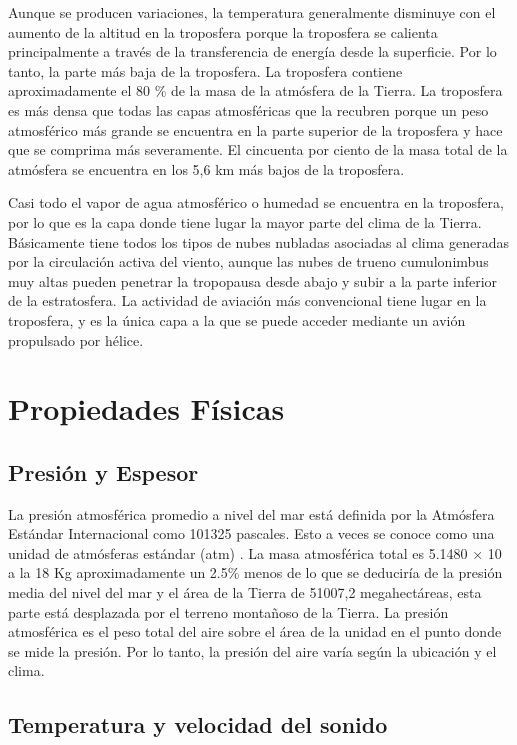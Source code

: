 \documentclass[12pt]{article}
\begin{document}
Aunque se producen variaciones, la temperatura generalmente disminuye con el aumento de la altitud en la troposfera porque la troposfera se calienta principalmente a través de la transferencia de energía desde la superficie. Por lo tanto, la parte más baja de la troposfera. La troposfera contiene aproximadamente el 80 \% de la masa de la atmósfera de la Tierra. La troposfera es más densa que todas las capas atmosféricas que la recubren porque un peso atmosférico más grande se encuentra en la parte superior de la troposfera y hace que se comprima más severamente. El cincuenta por ciento de la masa total de la atmósfera se encuentra en los 5,6 km más bajos de la troposfera.

Casi todo el vapor de agua atmosférico o humedad se encuentra en la troposfera, por lo que es la capa donde tiene lugar la mayor parte del clima de la Tierra. Básicamente tiene todos los tipos de nubes nubladas asociadas al clima generadas por la circulación activa del viento, aunque las nubes de trueno cumulonimbus muy altas pueden penetrar la tropopausa desde abajo y subir a la parte inferior de la estratosfera. La actividad de aviación más convencional tiene lugar en la troposfera, y es la única capa a la que se puede acceder mediante un avión propulsado por hélice.

\section{Propiedades Físicas}

\subsection{Presión y Espesor}

La presión atmosférica promedio a nivel del mar está definida por la Atmósfera Estándar Internacional como 101325 pascales. Esto a veces se conoce como una unidad de atmósferas estándar (atm) . La masa atmosférica total es 5.1480 × 10 a la 18 Kg aproximadamente un 2.5\% menos de lo que se deduciría de la presión media del nivel del mar y el área de la Tierra de 51007,2 megahectáreas, esta parte está desplazada por el terreno montañoso de la Tierra. La presión atmosférica es el peso total del aire sobre el área de la unidad en el punto donde se mide la presión. Por lo tanto, la presión del aire varía según la ubicación y el clima.  
\subsection{Temperatura y velocidad del sonido}
\end{document}
